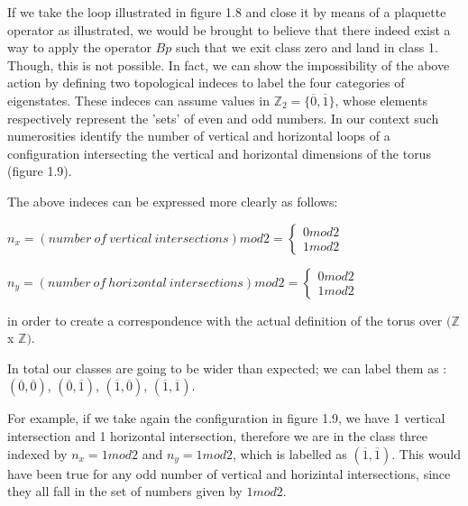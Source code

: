 \documentclass{Configuration_Files/PoliMi3i_thesis}
\begin{document}
If we take the loop illustrated in figure 1.8 and close it by means of a plaquette operator as illustrated, we would be brought to believe that there indeed exist a way to apply the operator $Bp$ such that we exit class zero and land in class 1. Though, this is not possible. \newline
In fact, we can show the impossibility of the above action by defining two topological indeces to label the four categories of eigenstates. These indeces can assume values in $\mathbb{Z}_2=\{\overline{0},\overline{1} \}$, whose elements respectively represent the 'sets' of even and odd numbers. In our context such numerosities identify the number of vertical and horizontal loops of a configuration intersecting the vertical and horizontal dimensions of the torus (figure 1.9).

The above indeces can be expressed more clearly as follows: 

\begin{center}
	$n_x= (number \ of \ vertical \ intersections)mod2 = 
	\begin{cases} 
		0mod2 \\
		1mod2  
	\end{cases}$ 
\end{center}
\begin{center}
	$n_y= (number \ of \ horizontal \ intersections)mod2 =\begin{cases} 
		0mod2 \\
		1mod2  
	\end{cases}$ 
\end{center}


in order to create a correspondence with the actual definition of the torus over $(\mathbb{Z}$ x $\mathbb{Z})$. 

In total our classes are going to be wider than expected; we can label them as : $(\overline{0},\overline{0} )$, $(\overline{0},\overline{1} )$, $(\overline{1},\overline{0})$, $(\overline{1},\overline{1})$.\newline

For example, if we take again the configuration in figure 1.9, we have 1 vertical intersection and 1 horizontal intersection, therefore we are in the class three indexed by $n_x=1mod2$ and $n_y=1mod2$, which is labelled as $(\overline{1},\overline{1})$. This would have been true for any odd number of vertical and horizintal intersections, since they all fall in the set of numbers given by $1mod2$.
\end{document}
